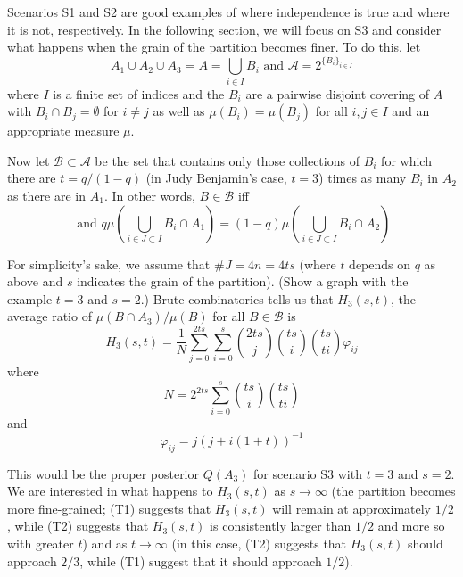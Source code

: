 \documentclass[11pt]{article}
\newcommand{\nootag}{}
\begin{document}
Scenarios S1 and S2 are good examples of where independence is true
and where it is not, respectively. In the following section, we will
focus on S3 and consider what happens when the grain of the partition
becomes finer. To do this, let
\begin{equation}
  A_{1}\cup{}A_{2}\cup{}A_{3}=A=\bigcup_{i\in{}I}B_{i}\mbox{ and }  \mathcal{A}=2^{\{B_{i}\}_{i\in{}I}}\nootag
\end{equation}
 where $I$ is a finite set of indices and the $B_{i}$ are a pairwise
 disjoint covering of $A$ with $B_{i}\cap{}B_{j}=\emptyset$ for
 $i\neq{}j$ as well as $\mu(B_{i})=\mu(B_{j})$ for all $i,j\in{}I$ and
 an appropriate measure $\mu$.

 Now let $\mathcal{B}\subset{}\mathcal{A}$ be the set that contains
 only those collections of $B_{i}$ for which there are $t=q/(1-q)$ (in
 Judy Benjamin's case, $t=3$) times as many $B_{i}$ in $A_{2}$ as
 there are in $A_{1}$. In other words, $B\in\mathcal{B}$ iff
\begin{equation}
  \mbox{ and }q\mu\left(\bigcup_{i\in{}J\subset{}I}B_{i}\cap{}A_{1}\right)=(1-q)\mu\left(\bigcup_{i\in{}J\subset{}I}B_{i}\cap{}A_{2}\right)\nootag
\end{equation}

For simplicity's sake, we assume that $\#J=4n=4ts$ (where $t$ depends
on $q$ as above and $s$ indicates the grain of the partition). (Show a
graph with the example $t=3$ and $s=2$.) Brute combinatorics tells us
that $H_{3}(s,t)$, the average ratio of $\mu(B\cap{}A_{3})/\mu(B)$ for
all $B\in\mathcal{B}$ is
\begin{equation}
  H_{3}(s,t)=\frac{1}{N}\sum_{j=0}^{2ts}\sum_{i=0}^{s}\binom{2ts}{j}\binom{ts}{i}\binom{ts}{ti}\varphi_{ij}\nootag
\end{equation}
where
\begin{equation}
  N=2^{2ts}\sum_{i=0}^{s}\binom{ts}{i}\binom{ts}{ti}\nootag
\end{equation}
and
\begin{equation}
  \varphi_{ij}=j(j+i(1+t))^{-1}\nootag
\end{equation}

This would be the proper posterior $Q(A_{3})$ for scenario S3 with
$t=3$ and $s=2$. We are interested in what happens to $H_{3}(s,t)$ as
$s\rightarrow\infty$ (the partition becomes more fine-grained; (T1)
suggests that $H_{3}(s,t)$ will remain at approximately $1/2$, while
(T2) suggests that $H_{3}(s,t)$ is consistently larger than $1/2$ and
more so with greater $t$) and as $t\rightarrow\infty$ (in this case,
(T2) suggests that $H_{3}(s,t)$ should approach $2/3$, while (T1)
suggest that it should approach $1/2$).
\end{document}
